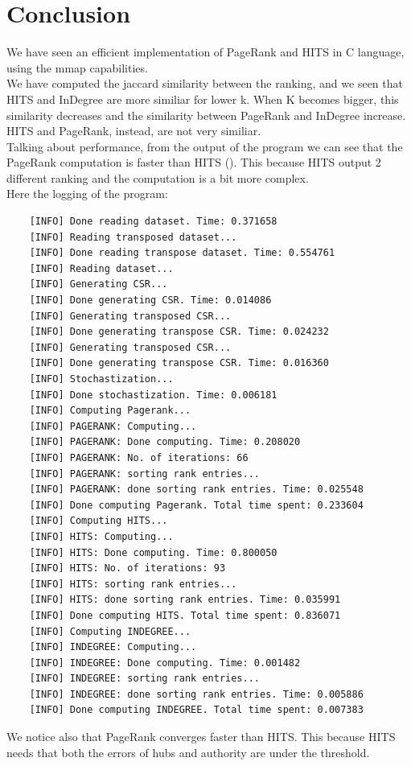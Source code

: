 \documentclass[10pt]{article}
\begin{document}
\section{Conclusion}
We have seen an efficient implementation of PageRank and HITS in C language, using the mmap capabilities.\\
We have computed the jaccard similarity between the ranking, and we seen that HITS and InDegree are more similiar for lower k. When K becomes bigger, this similarity decreases and the similarity between PageRank and InDegree increase.\\
HITS and PageRank, instead, are not very similiar.\\
Talking about performance, from the output of the program we can see that the PageRank computation is faster than HITS (). This because HITS output 2 different ranking and the computation is a bit more complex.\\
Here the logging of the program:\\
\begin{verbatim}
    [INFO] Done reading dataset. Time: 0.371658
    [INFO] Reading transposed dataset...
    [INFO] Done reading transpose dataset. Time: 0.554761
    [INFO] Reading dataset...
    [INFO] Generating CSR...
    [INFO] Done generating CSR. Time: 0.014086
    [INFO] Generating transposed CSR...
    [INFO] Done generating transpose CSR. Time: 0.024232
    [INFO] Generating transposed CSR...
    [INFO] Done generating transpose CSR. Time: 0.016360
    [INFO] Stochastization...
    [INFO] Done stochastization. Time: 0.006181
    [INFO] Computing Pagerank...
    [INFO] PAGERANK: Computing... 
    [INFO] PAGERANK: Done computing. Time: 0.208020
    [INFO] PAGERANK: No. of iterations: 66
    [INFO] PAGERANK: sorting rank entries...
    [INFO] PAGERANK: done sorting rank entries. Time: 0.025548
    [INFO] Done computing Pagerank. Total time spent: 0.233604
    [INFO] Computing HITS...
    [INFO] HITS: Computing... 
    [INFO] HITS: Done computing. Time: 0.800050
    [INFO] HITS: No. of iterations: 93
    [INFO] HITS: sorting rank entries...
    [INFO] HITS: done sorting rank entries. Time: 0.035991
    [INFO] Done computing HITS. Total time spent: 0.836071
    [INFO] Computing INDEGREE...
    [INFO] INDEGREE: Computing...
    [INFO] INDEGREE: Done computing. Time: 0.001482
    [INFO] INDEGREE: sorting rank entries...
    [INFO] INDEGREE: done sorting rank entries. Time: 0.005886
    [INFO] Done computing INDEGREE. Total time spent: 0.007383
\end{verbatim}
We notice also that PageRank converges faster than HITS. This because HITS needs that both the errors of hubs and authority are under the threshold.
\end{document}
